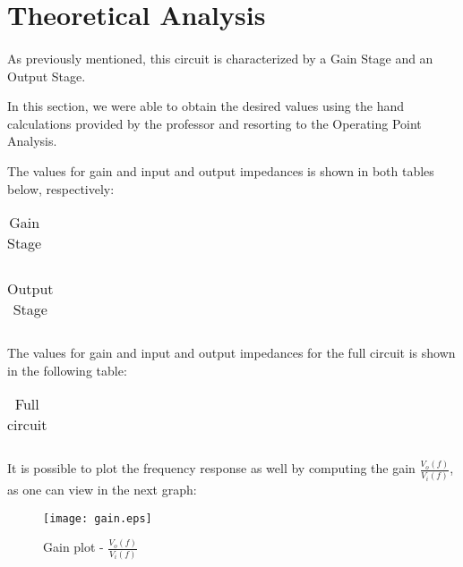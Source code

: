 \section{Theoretical Analysis}
\label{sec:analysis}
\paragraph{}

\par As previously mentioned, this circuit is characterized by a Gain Stage and an Output Stage.
\par In this section, we were able to obtain the desired values using the hand calculations provided by the professor and resorting to the Operating Point Analysis.
\par The values for gain and input and output impedances is shown in both tables below, respectively:

\begin{table}[H]
    \centering
    \begin{tabular}{|c|c|}
    \hline
        
    \end{tabular}
    \caption{Gain Stage}
    \label{table4a}
\end{table}

\begin{table}[H]
    \centering
    \begin{tabular}{|c|c|}
    \hline
        
    \end{tabular}
    \caption{Output Stage}
    \label{table4a}
\end{table}

\par The values for gain and input and output impedances for the full circuit is shown in the following table:

\begin{table}[H]
    \centering
    \begin{tabular}{|c|c|}
    \hline
        
    \end{tabular}
    \caption{Full circuit}
    \label{table4a}
\end{table}



\par It is possible to plot the frequency response as well by computing the gain $\frac{V_o(f)}{V_i(f)}$, as one can view in the next graph:

\begin{figure}[H]
	\texttt{[image: gain.eps]}
	\centering
	\caption{Gain plot - $\frac{V_o(f)}{V_i(f)}$}
	\label{pha}
\end{figure}

